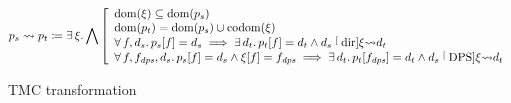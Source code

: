 \begin{figure}[tp]
    \[
        \datalangProg_s \tmc \datalangProg_t
        \coloneqq
        \exists \datalangRenaming \ldotp
        \bigwedge \left[ \begin{array}{l}
                \dom{\datalangRenaming} \subseteq \dom{\datalangProg_s}
            \\
                \dom{\datalangProg_t} = \dom{\datalangProg_s} \cup \codom{\datalangRenaming}
            \\
                \forall \datalangFn, \datalangDef_s \ldotp
                \datalangProg_s [\datalangFn] = \datalangDef_s \implies
                \exists \datalangDef_t \ldotp
                \datalangProg_t [\datalangFn] = \datalangDef_t \wedge \datalangDef_s \tmcDir{\datalangRenaming} \datalangDef_t
            \\
                \forall \datalangFn, \datalangFn_\mathit{dps}, \datalangDef_s \ldotp
                \datalangProg_s [\datalangFn] = \datalangDef_s \wedge \datalangRenaming [\datalangFn] = \datalangFn_{\mathit{dps}} \implies
                \exists \datalangDef_t \ldotp
                \datalangProg_t [\datalangFn_\mathit{dps}] = \datalangDef_t \wedge \datalangDef_s \tmcDps{\datalangRenaming} \datalangDef_t
        \end{array} \right.
    \]
    \caption{TMC transformation}
    \label{fig:tmc}
\end{figure}